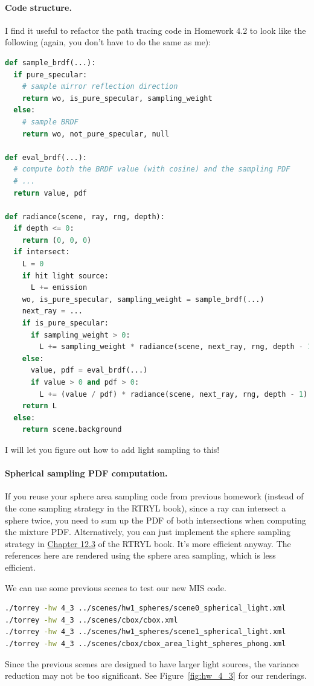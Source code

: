 \paragraph{Code structure.} I find it useful to refactor the path tracing code in Homework 4.2 to look like the following (again, you don't have to do the same as me):
\begin{lstlisting}[language=python]
def sample_brdf(...):
  if pure_specular:
    # sample mirror reflection direction
    return wo, is_pure_specular, sampling_weight
  else:
    # sample BRDF
    return wo, not_pure_specular, null

def eval_brdf(...):
  # compute both the BRDF value (with cosine) and the sampling PDF
  # ...
  return value, pdf

def radiance(scene, ray, rng, depth):
  if depth <= 0:
    return (0, 0, 0)
  if intersect:
    L = 0
    if hit light source:
      L += emission
    wo, is_pure_specular, sampling_weight = sample_brdf(...)
    next_ray = ...
    if is_pure_specular:
      if sampling_weight > 0:
        L += sampling_weight * radiance(scene, next_ray, rng, depth - 1)
    else:
      value, pdf = eval_brdf(...)
      if value > 0 and pdf > 0:
        L += (value / pdf) * radiance(scene, next_ray, rng, depth - 1)
    return L
  else:
    return scene.background
\end{lstlisting}
I will let you figure out how to add light sampling to this!

\paragraph{Spherical sampling PDF computation.} If you reuse your sphere area sampling code from previous homework (instead of the cone sampling strategy in the RTRYL book), since a ray can intersect a sphere twice, you need to sum up the PDF of both intersections when computing the mixture PDF. Alternatively, you can just implement the sphere sampling strategy in \href{https://raytracing.github.io/books/RayTracingTheRestOfYourLife.html#cleaninguppdfmanagement/samplingasphereobject}{Chapter 12.3} of the RTRYL book. It's more efficient anyway. The references here are rendered using the sphere area sampling, which is less efficient.

We can use some previous scenes to test our new MIS code.
\begin{lstlisting}[language=bash]
./torrey -hw 4_3 ../scenes/hw1_spheres/scene0_spherical_light.xml
./torrey -hw 4_3 ../scenes/cbox/cbox.xml
./torrey -hw 4_3 ../scenes/hw1_spheres/scene1_spherical_light.xml
./torrey -hw 4_3 ../scenes/cbox/cbox_area_light_spheres_phong.xml
\end{lstlisting}
Since the previous scenes are designed to have larger light sources, the variance reduction may not be too significant. See Figure~\ref{fig:hw_4_3} for our renderings.

